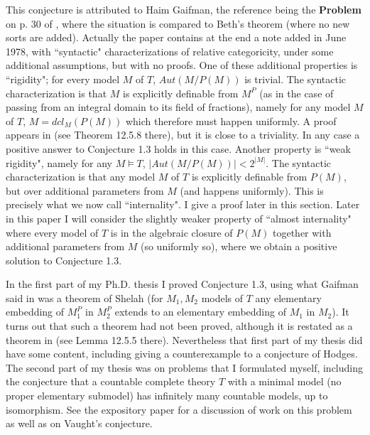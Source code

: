 \documentclass[12pt]{article}
\begin{document}
This conjecture is   attributed to Haim Gaifman, the reference being the {\bf Problem} on p. 30 of \cite{Gaifman}, where the situation is compared to Beth's theorem (where no new sorts are added).   Actually the paper \cite{Gaifman} contains at the end a note added in  June 1978, with ``syntactic" characterizations of relative categoricity, under some additional assumptions, but with no proofs.  One of these additional properties is ``rigidity"; for every model $M$ of $T$, $Aut(M/P(M))$ is trivial.  The  syntactic characterization is that $M$ is explicitly definable from $M^{P}$ (as in the case of passing from an integral domain to its field of fractions),  namely for any model $M$ of $T$, $M = dcl_{M}(P(M))$ which therefore must happen uniformly.   A proof appears in \cite{Hodges-book}  (see Theorem 12.5.8 there),  but it is close to a triviality. In any case a positive answer to Conjecture 1.3 holds in this case.  Another property is ``weak rigidity", namely   for any $M\models T$,  $|Aut(M/P(M))| <  2^{|M|}$.  The syntactic characterization is that  any model $M$ of $T$ is explicitly definable from $P(M)$, but over additional parameters from $M$ (and happens uniformly). This is precisely what we now call ``internality".  I  give a proof later in this section. 
Later in this paper I will consider the slightly weaker property of ``almost internality" where every model of $T$ is in the algebraic closure of $P(M)$ together with additional parameters from $M$ (so uniformly so), where we obtain a positive solution to Conjecture 1.3.


In the first part of my Ph.D. thesis \cite{Pillay-thesis} I  proved Conjecture 1.3, using what Gaifman said in \cite{Gaifman-conjecture}  was a  theorem of Shelah (for $M_{1}, M_{2}$ models of $T$ any elementary embedding of
$M_{1}^{P}$ in $M_{2}^{P}$ extends to an elementary embedding of $M_{1}$ in $M_{2}$). It turns out that such a theorem had not been proved, although it is restated as a theorem in \cite{Hodges-book} (see Lemma 12.5.5 there).  Nevertheless that first part of my thesis did have some content, including giving a counterexample to a conjecture of Hodges.  The second part of my thesis was on problems that I  formulated myself, including the conjecture that a countable complete theory $T$ with a minimal model (no proper elementary submodel) has infinitely many countable models, up to isomorphism.  See the expository paper \cite{Pillay-Tanovic} for a discussion of work on this problem as well as on Vaught's conjecture.  
\end{document}
